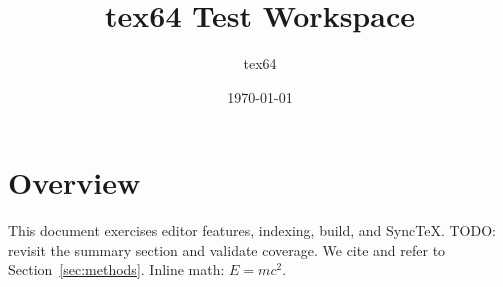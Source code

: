 \documentclass{article}
\title{tex64 Test Workspace}
\author{tex64}
\date{\today}
\begin{document}
\maketitle
\tableofcontents
\listoffigures
\listoftables

\section{Overview}\label{sec:overview}
This document exercises editor features, indexing, build, and SyncTeX.
TODO: revisit the summary section and validate  coverage.
We cite \cite{knuth1984,lamport1994} and refer to Section~\ref{sec:methods}.
Inline math: $E=mc^2$.






\appendix




\end{document}
